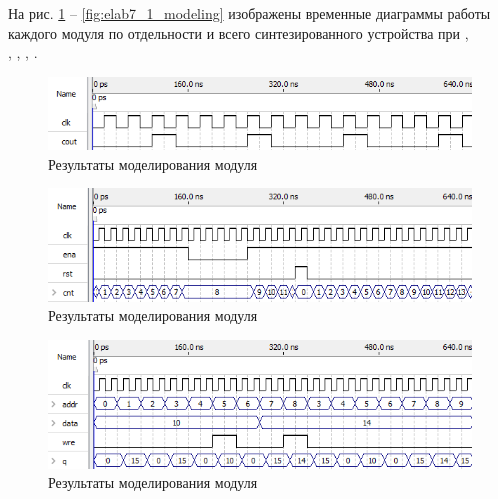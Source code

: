 На рис. \ref{fig:elab7_1_modeling_1} -- \ref{fig:elab7_1_modeling} изображены временные диаграммы работы каждого модуля по отдельности и всего синтезированного устройства при ,\\ , , , .

\begin{figure}[H]
\begin{center}
	\includegraphics[width=\textwidth]{elab7_1_modeling_1}
	\caption{Результаты моделирования модуля }
	\label{fig:elab7_1_modeling_1}
\end{center}
\end{figure}

\begin{figure}[H]
\begin{center}
	\includegraphics[width=\textwidth]{elab7_1_modeling_2}
	\caption{Результаты моделирования модуля }
	\label{fig:elab7_1_modeling_2}
\end{center}
\end{figure}

\begin{figure}[H]
\begin{center}
	\includegraphics[width=\textwidth]{elab7_1_modeling_3}
	\caption{Результаты моделирования модуля }
	\label{fig:elab7_1_modeling_3}
\end{center}
\end{figure}

